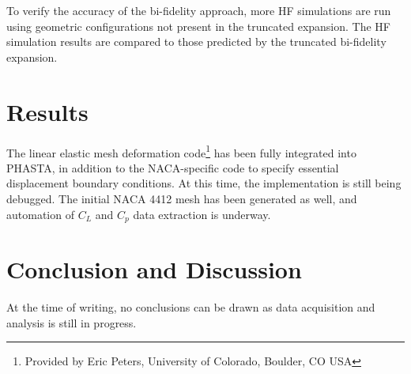 \documentclass[11pt]{article}
\begin{document}
To verify the accuracy of the bi-fidelity approach, more HF simulations are run using geometric configurations not present in the truncated expansion. The HF simulation results are compared to those predicted by the truncated bi-fidelity expansion.

\section{Results}

The linear elastic mesh deformation code\footnote{Provided by Eric Peters, University of Colorado, Boulder, CO USA} has been fully integrated into PHASTA, in addition to the NACA-specific code to specify essential displacement boundary conditions. At this time, the implementation is still being debugged. The initial NACA 4412 mesh has been generated as well, and automation of $C_L$ and $C_p$ data extraction is underway.

\section{Conclusion and Discussion}

At the time of writing, no conclusions can be drawn as data acquisition and analysis is still in progress.





\label{lastpage}
\end{document}
